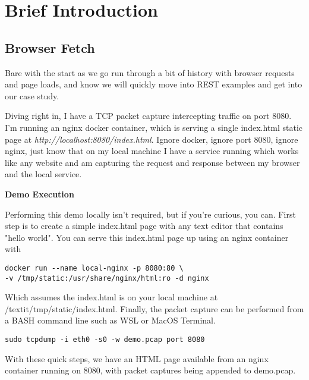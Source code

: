 \chapter{Brief Introduction}
\section{Browser Fetch}

Bare with the start as we go run through a bit of history with browser requests and page loads, and know we will quickly move into REST examples and get into our case study.

Diving right in, I have a TCP packet capture intercepting traffic on port 8080.  I'm running an nginx docker container, which is serving a single index.html static page at \textit{http://localhost:8080/index.html}. Ignore docker, ignore port 8080, ignore nginx, just know that on my local machine I have a service running which works like any website and am capturing the request and response between my browser and the local service.

\begin{sidebar}
\begin{minipage}{\linewidth}
\begin{center}
\textbf{Demo Execution}
\end{center}
Performing this demo locally isn't required, but if you're curious, you can.  First step is to create a simple index.html page with any text editor that contains "hello world".  You can serve this index.html page up using an nginx container with
\begin{code}
\begin{lstlisting}[belowskip=-\baselineskip]
docker run --name local-nginx -p 8080:80 \
-v /tmp/static:/usr/share/nginx/html:ro -d nginx
\end{lstlisting}
\end{code}
Which assumes the index.html is on your local machine at /textit{/tmp/static/index.html}. Finally, the packet capture can be performed from a BASH command line such as WSL or MacOS Terminal.
\begin{code}
\begin{lstlisting}[belowskip=-\baselineskip]
sudo tcpdump -i eth0 -s0 -w demo.pcap port 8080
\end{lstlisting}
\end{code}
With these quick steps, we have an HTML page available from an nginx container running on 8080, with packet captures being appended to demo.pcap.
\end{minipage}
\end{sidebar}

